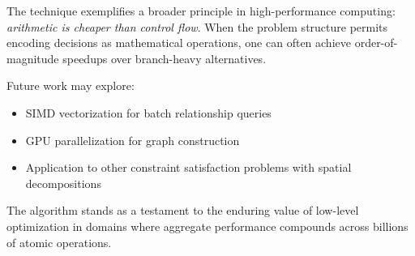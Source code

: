 \documentclass[11pt,a4paper]{article}
\begin{document}
The technique exemplifies a broader principle in high-performance computing: \emph{arithmetic is cheaper than control flow}. When the problem structure permits encoding decisions as mathematical operations, one can often achieve order-of-magnitude speedups over branch-heavy alternatives.

Future work may explore:
\begin{itemize}
    \item SIMD vectorization for batch relationship queries
    \item GPU parallelization for graph construction
    \item Application to other constraint satisfaction problems with spatial decompositions
\end{itemize}

The algorithm stands as a testament to the enduring value of low-level optimization in domains where aggregate performance compounds across billions of atomic operations.
\end{document}
